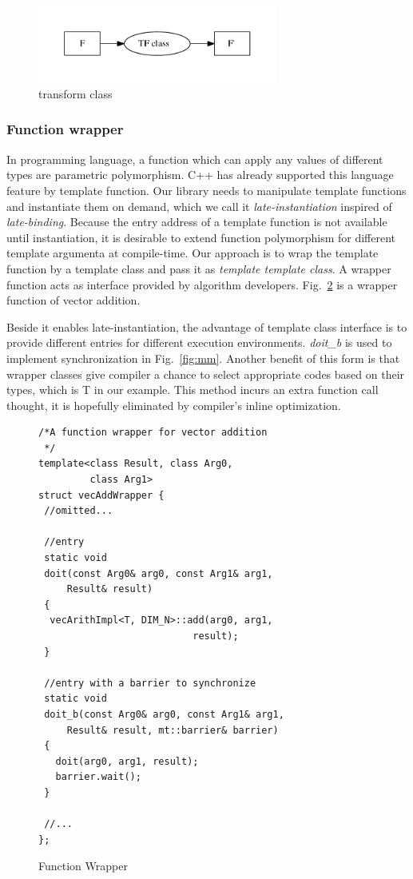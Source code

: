 \documentclass[10pt, conference, compsocconf]{IEEEtran}
\begin{document}
\begin{figure}
\centering
\includegraphics[width=3.1in]{map-class}
\caption{transform class}\label{fig:tfcls}
\end{figure}

\subsubsection{Function wrapper}\label{section:interface}
In programming language, a function which can apply any values of
different types are parametric polymorphism. C++ has already supported
this language feature by template function. Our library needs to
manipulate template functions and instantiate them on demand, which we
call it \emph{late-instantiation} inspired of
\emph{late-binding}. Because the entry address of a template function is not available until instantiation, it is desirable to extend function
polymorphism for different template argumenta  at compile-time. Our
approach is to wrap the template function by a template class and pass
it as \emph{template template class}. A wrapper function acts
as interface provided by algorithm developers. Fig.~\ref{lst:wrapper} is a wrapper function of vector addition. 

Beside it enables late-instantiation, the advantage of template class interface
is to provide different entries for different execution environments. \emph{doit\_b} is
used to implement synchronization in Fig.~\ref{fig:mm}.  Another benefit of
this form is that wrapper classes  give compiler a chance to select
appropriate codes based on their types, which is T in our example. This method incurs an extra function call  thought, it is hopefully  eliminated by
compiler's inline optimization.

\begin{figure}[!htp]
\begin{minipage}[tb]{\linewidth}
\makebox[\textwidth]{\hrulefill}
\begin{small}
\begin{verbatim}
/*A function wrapper for vector addition
 */
template<class Result, class Arg0, 
         class Arg1>
struct vecAddWrapper {
 //omitted...
 
 //entry
 static void 
 doit(const Arg0& arg0, const Arg1& arg1, 
     Result& result)
 {
  vecArithImpl<T, DIM_N>::add(arg0, arg1, 
                           result);
 }

 //entry with a barrier to synchronize
 static void 
 doit_b(const Arg0& arg0, const Arg1& arg1, 
     Result& result, mt::barrier& barrier)
 {
   doit(arg0, arg1, result);
   barrier.wait();
 }

 //...
};
\end{verbatim}
\end{small}
\makebox[\textwidth]{\hrulefill}
\end{minipage}
\caption{Function Wrapper}\label{lst:wrapper}
\end{figure}
\end{document}
